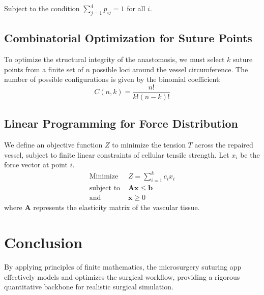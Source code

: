 \documentclass[11pt]{article}
\begin{document}
Subject to the condition $\sum_{j=1}^4 p_{ij} = 1$ for all $i$.

\subsection{Combinatorial Optimization for Suture Points}
To optimize the structural integrity of the anastomosis, we must select $k$ suture points from a finite set of $n$ possible loci around the vessel circumference. The number of possible configurations is given by the binomial coefficient:
\begin{equation}
C(n, k) = \frac{n!}{k!(n-k)!}
\end{equation}

\subsection{Linear Programming for Force Distribution}
We define an objective function $Z$ to minimize the tension $T$ across the repaired vessel, subject to finite linear constraints of cellular tensile strength. Let $x_i$ be the force vector at point $i$.
\begin{align}
    \text{Minimize } & Z = \sum_{i=1}^{k} c_i x_i \\
    \text{subject to } & \mathbf{A} \mathbf{x} \le \mathbf{b} \\
    \text{and } & \mathbf{x} \ge 0
\end{align}
where $\mathbf{A}$ represents the elasticity matrix of the vascular tissue.

\section{Conclusion}
By applying principles of finite mathematics, the microsurgery suturing app effectively models and optimizes the surgical workflow, providing a rigorous quantitative backbone for realistic surgical simulation.
\end{document}
